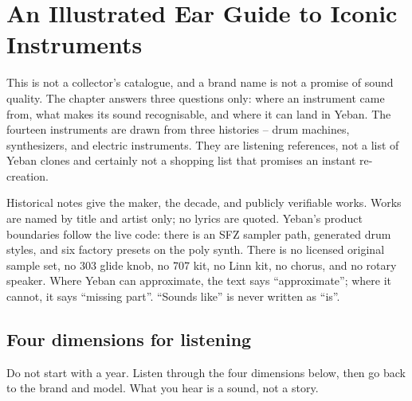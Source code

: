 \chapter{An Illustrated Ear Guide to Iconic Instruments}
\label{chap:iconic-instruments}


This is not a collector's catalogue, and a brand name is not a promise of
sound quality. The chapter answers three questions only: where an instrument
came from, what makes its sound recognisable, and where it can land in Yeban.
The fourteen instruments are drawn from three histories -- drum machines,
synthesizers, and electric instruments. They are listening references, not a
list of Yeban clones and certainly not a shopping list that promises an
instant re-creation.

Historical notes give the maker, the decade, and publicly verifiable works.
Works are named by title and artist only; no lyrics are quoted. Yeban's
product boundaries follow the live code: there is an SFZ sampler path,
generated drum styles, and six factory presets on the poly synth. There is no
licensed original sample set, no 303 glide knob, no 707 kit, no Linn kit, no
chorus, and no rotary speaker. Where Yeban can approximate, the text says
``approximate''; where it cannot, it says ``missing part''. ``Sounds like''
is never written as ``is''.

\section{Four dimensions for listening}
\label{sec:iconic-listening}

Do not start with a year. Listen through the four dimensions below, then go
back to the brand and model. What you hear is a sound, not a story.

